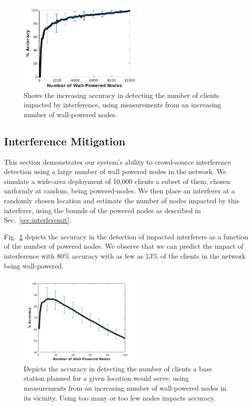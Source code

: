 \begin{figure}
\includegraphics[height=4.5cm]{figures/InterferenceEstimation.jpg}
\caption{Shows the increasing accuracy in detecting the number of clients impacted by interference, using measurements from an increasing number of wall-powered nodes.}
\label{fig:intermit}
\end{figure}

\subsection{Interference Mitigation}\label{sec:resint}
This section demonstrates our system's ability to crowd-source interference detection using a large number of wall powered nodes in the network. We simulate a wide-area deployment of 10,000 clients a subset of them, chosen uniformly at random, being powered-nodes. We then place an interferer at a randomly chosen location and estimate the number of nodes impacted by this interferer, using the bounds of the powered nodes as described in Sec.~\ref{sec:interferemit}.

Fig.~\ref{fig:intermit} depicts the accuracy in the detection of impacted interferers as a function of the number of powered nodes. We observe that we can predict the impact of interference with $80\%$ accuracy with as few as $13\%$ of the clients in the network being wall-powered. 

\begin{figure}
\includegraphics[height=4.5cm]{figures/BaseStationCounter.jpg}
\caption{Depicts the accuracy in detecting the number of clients a base station planned for a given location would serve, using measurements from an increasing number of wall-powered nodes in its vicinity. Using too many or too few nodes impacts accuracy. }
\label{fig:netplan}
\end{figure}

